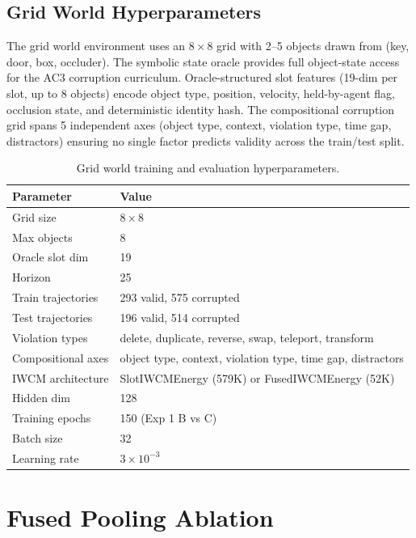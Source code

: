 \documentclass[12pt]{article}
\begin{document}
\subsection{Grid World Hyperparameters}

The grid world environment uses an $8\times8$ grid with 2--5 objects drawn from (key, door, box, occluder). The symbolic state oracle provides full object-state access for the AC3 corruption curriculum. Oracle-structured slot features (19-dim per slot, up to 8 objects) encode object type, position, velocity, held-by-agent flag, occlusion state, and deterministic identity hash. The compositional corruption grid spans 5 independent axes (object type, context, violation type, time gap, distractors) ensuring no single factor predicts validity across the train/test split.

\begin{table}[h]
\centering
\caption{Grid world training and evaluation hyperparameters.}
\label{app:tab:grid_params}
\begin{tabular}{@{}ll@{}}
\toprule
Parameter & Value \\
\midrule
Grid size & $8\times 8$ \\
Max objects & 8 \\
Oracle slot dim & 19 \\
Horizon & 25 \\
Train trajectories & 293 valid, 575 corrupted \\
Test trajectories & 196 valid, 514 corrupted \\
Violation types & delete, duplicate, reverse, swap, teleport, transform \\
Compositional axes & object type, context, violation type, time gap, distractors \\
IWCM architecture & SlotIWCMEnergy (579K) or FusedIWCMEnergy (52K) \\
Hidden dim & 128 \\
Training epochs & 150 (Exp 1 B vs C) \\
Batch size & 32 \\
Learning rate & $3\times 10^{-3}$ \\
\bottomrule
\end{tabular}
\end{table}

\section{Fused Pooling Ablation}
\label{app:pooling}
\end{document}
